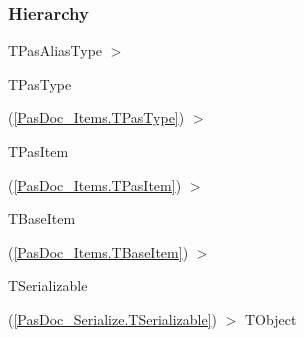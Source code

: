 \documentclass{report}
\begin{document}
\subsubsection*{\large{\textbf{Hierarchy}}\normalsize\hspace{1ex}\hfill}
TPasAliasType {$>$} \begin{ttfamily}TPasType\end{ttfamily}(\ref{PasDoc_Items.TPasType}) {$>$} \begin{ttfamily}TPasItem\end{ttfamily}(\ref{PasDoc_Items.TPasItem}) {$>$} \begin{ttfamily}TBaseItem\end{ttfamily}(\ref{PasDoc_Items.TBaseItem}) {$>$} \begin{ttfamily}TSerializable\end{ttfamily}(\ref{PasDoc_Serialize.TSerializable}) {$>$} 
TObject
\end{document}
